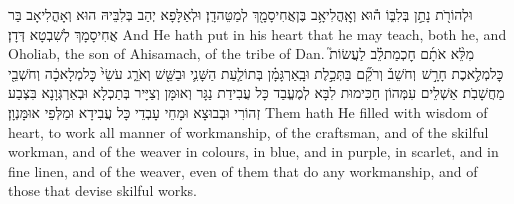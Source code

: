 {וּלְהוֹרֹ֖ת נָתַ֣ן בְּלִבּ֑וֹ ה֕וּא וְאׇֽהֳלִיאָ֥ב בֶּן\maqqaf אֲחִיסָמָ֖ךְ לְמַטֵּה\maqqaf דָֽן׃}
{וּלְאַלָּפָא יְהַב בְּלִבֵּיהּ הוּא וְאָהֳלִיאָב בַּר אֲחִיסָמָךְ לְשִׁבְטָא דְּדָן׃}
{And He hath put in his heart that he may teach, both he, and Oholiab, the son of Ahisamach, of the tribe of Dan.}{}
{מִלֵּ֨א אֹתָ֜ם חׇכְמַת\maqqaf לֵ֗ב לַעֲשׂוֹת֮ כׇּל\maqqaf מְלֶ֣אכֶת חָרָ֣שׁ \pasek  וְחֹשֵׁב֒ וְרֹקֵ֞ם בַּתְּכֵ֣לֶת וּבָֽאַרְגָּמָ֗ן בְּתוֹלַ֧עַת הַשָּׁנִ֛י וּבַשֵּׁ֖שׁ וְאֹרֵ֑ג עֹשֵׂי֙ כׇּל\maqqaf מְלָאכָ֔ה וְחֹשְׁבֵ֖י מַחֲשָׁבֹֽת׃}
{אַשְׁלֵים עִמְּהוֹן חַכִּימוּת לִבָּא לְמֶעֱבַד כָּל עֲבִידַת נַגָּר וְאוּמָּן וְצַיָּיר בְּתַכְלָא וּבְאַרְגְּוָנָא בִּצְבַע זְהוֹרִי וּבְבוּצָא וּמָחֵי עָבְדֵי כָּל עֲבִידָא וּמַלְּפֵי אוּמָּנְוָן׃}
{Them hath He filled with wisdom of heart, to work all manner of workmanship, of the craftsman, and of the skilful workman, and of the weaver in colours, in blue, and in purple, in scarlet, and in fine linen, and of the weaver, even of them that do any workmanship, and of those that devise skilful works.}{}

